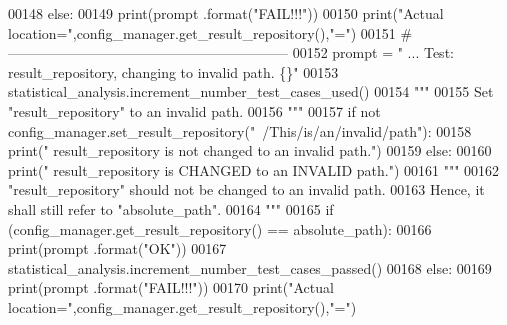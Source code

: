\begin{DoxyCode}
00148         \textcolor{keywordflow}{else}:
00149             print(prompt .format(\textcolor{stringliteral}{"FAIL!!!"}))
00150             print(\textcolor{stringliteral}{"Actual location="},config\_manager.get\_result\_repository(),\textcolor{stringliteral}{"="})
00151         \textcolor{comment}{# ------------------------------------------------------------}
00152         prompt = \textcolor{stringliteral}{"  ... Test: result\_repository, changing to invalid path.  \{\}"}
00153         statistical\_analysis.increment\_number\_test\_cases\_used()
00154         \textcolor{stringliteral}{"""}
00155 \textcolor{stringliteral}{            Set "result\_repository" to an invalid path.}
00156 \textcolor{stringliteral}{        """}
00157         \textcolor{keywordflow}{if} \textcolor{keywordflow}{not} config\_manager.set\_result\_repository(\textcolor{stringliteral}{"~/This/is/an/invalid/path"}):
00158             print(\textcolor{stringliteral}{" result\_repository is not changed to an invalid path."})
00159         \textcolor{keywordflow}{else}:
00160             print(\textcolor{stringliteral}{" result\_repository is CHANGED to an INVALID path."})
00161         \textcolor{stringliteral}{"""}
00162 \textcolor{stringliteral}{            "result\_repository" should not be changed to an invalid path.}
00163 \textcolor{stringliteral}{            Hence, it shall still refer to "absolute\_path".}
00164 \textcolor{stringliteral}{        """}
00165         \textcolor{keywordflow}{if} (config\_manager.get\_result\_repository() == absolute\_path):
00166             print(prompt .format(\textcolor{stringliteral}{"OK"}))
00167             statistical\_analysis.increment\_number\_test\_cases\_passed()
00168         \textcolor{keywordflow}{else}:
00169             print(prompt .format(\textcolor{stringliteral}{"FAIL!!!"}))
00170             print(\textcolor{stringliteral}{"Actual location="},config\_manager.get\_result\_repository(),\textcolor{stringliteral}{"="})
\end{DoxyCode}

